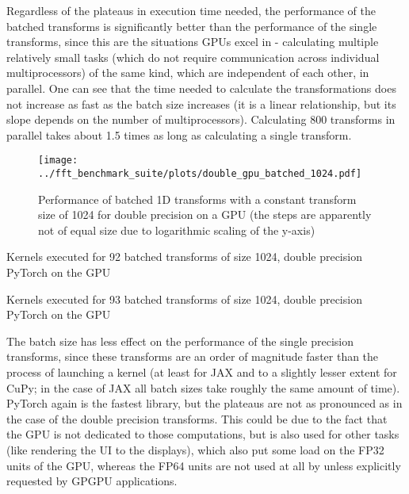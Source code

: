 \documentclass[english,11pt,a4paper,table]{article} %
\begin{document}
Regardless of the plateaus in execution time needed, the performance of the batched transforms is significantly better than the performance of the single transforms, since this are the situations GPUs excel in - calculating multiple relatively small tasks (which do not require communication across individual multiprocessors) of the same kind, which are independent of each other, in parallel.
One can see that the time needed to calculate the transformations does not increase as fast as the batch size increases (it is a linear relationship, but its slope depends on the number of multiprocessors).
Calculating 800 transforms in parallel takes about 1.5 times as long as calculating a single transform.

\begin{figure}[H]
	\centering
	\texttt{[image: ../fft\_benchmark\_suite/plots/double\_gpu\_batched\_1024.pdf]}
	\caption{Performance of batched 1D transforms with a constant transform size of 1024 for double precision on a GPU (the steps are apparently not of equal size due to logarithmic scaling of the y-axis)}
	\label{batched-double-size-1024}
\end{figure}

\begin{table}[H]
	\centering
	\begin{footnotesize}
	
	\end{footnotesize}
	\caption{Kernels executed for 92 batched transforms of size 1024, double precision PyTorch on the GPU}
	\label{batched-kernel-92}
\end{table}

\begin{table}[H]
	\centering
	\begin{footnotesize}
	
	\end{footnotesize}
	\caption{Kernels executed for 93 batched transforms of size 1024, double precision PyTorch on the GPU}
	\label{batched-kernel-93}
\end{table}

The batch size has less effect on the performance of the single precision transforms, since these transforms are an order of magnitude faster than the process of launching a kernel (at least for JAX and to a slightly lesser extent for CuPy; in the case of JAX all batch sizes take roughly the same amount of time).
PyTorch again is the fastest library, but the plateaus are not as pronounced as in the case of the double precision transforms.
This could be due to the fact that the GPU is not dedicated to those computations, but is also used for other tasks (like rendering the UI to the displays), which also put some load on the FP32 units of the GPU, whereas the FP64 units are not used at all by unless explicitly requested by GPGPU applications.
\end{document}
